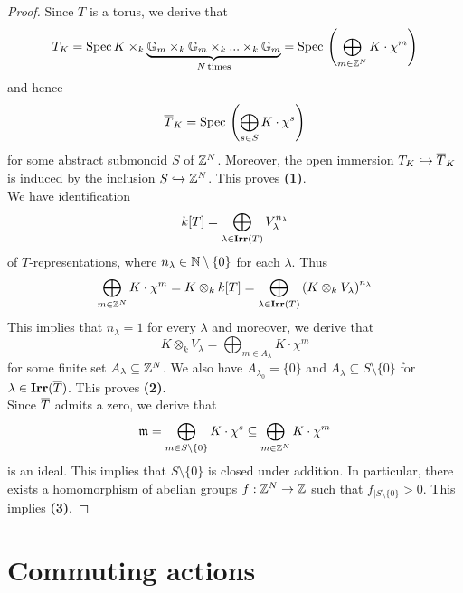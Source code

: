 \begin{proof}
Since $T$ is a torus, we derive that
$$T_K = \mathrm{Spec}\, K \times_k \underbrace{\mathbb{G}_{m}\times_k \mathbb{G}_{m}\times_k ...\times_k \mathbb{G}_{m}}_{N\,\mathrm{times}} = \mathrm{Spec}\, \left(\bigoplus_{m\in {\mathbb Z}^N}K\cdot \chi^m\right)$$
and hence
$$\overline{T}_K = \mathrm{Spec}\, \left(\bigoplus_{s\in S}K\cdot \chi^s\right)$$
for some abstract submonoid $S$ of ${\mathbb Z}^N$. Moreover, the open immersion $T_K\hookrightarrow \overline{T}_K$ is induced by the inclusion $S \hookrightarrow {\mathbb Z}^N$. This proves \textbf{(1)}.\\
We have identification
$$k[T] = \bigoplus_{\lambda\in \mathbf{Irr}(T)}V_{\lambda}^{n_{\lambda}}$$
of $T$-representations, where $n_{\lambda}\in {\mathbb N}\setminus \{0\}$ for each $\lambda$. Thus
$$\bigoplus_{m\in {\mathbb Z}^N}K\cdot \chi^m = K\otimes_kk[T] = \bigoplus_{\lambda\in \mathbf{Irr}(T)}\left(K\otimes_kV_{\lambda}\right)^{n_{\lambda}}$$
This implies that $n_{\lambda} = 1$ for every $\lambda$ and moreover, we derive that
$$K\otimes_kV_{\lambda} = \bigoplus_{m\in A_{\lambda}}K\cdot \chi^m$$
for some finite set $A_{\lambda}\subseteq {\mathbb Z}^N$. We also have $A_{\lambda_0} = \{0\}$ and $A_{\lambda}\subseteq S\setminus \{0\}$ for $\lambda \in \mathbf{Irr}(\overline{T})$. This proves \textbf{(2)}.\\
Since $\overline{T}$ admits a zero, we derive that
$$\mathfrak{m} = \bigoplus_{m \in S\setminus\{0\}}K\cdot \chi^s \subseteq \bigoplus_{m\in {\mathbb Z}^N}K\cdot \chi^m$$
is an ideal. This implies that $S\setminus \{0\}$ is closed under addition. In particular, there exists a homomorphism of abelian groups $f:{\mathbb Z}^N\rightarrow {\mathbb Z}$ such that $f_{\mid S\setminus \{0\}}>0$. This implies \textbf{(3)}.
\end{proof}

\section{Commuting actions}

